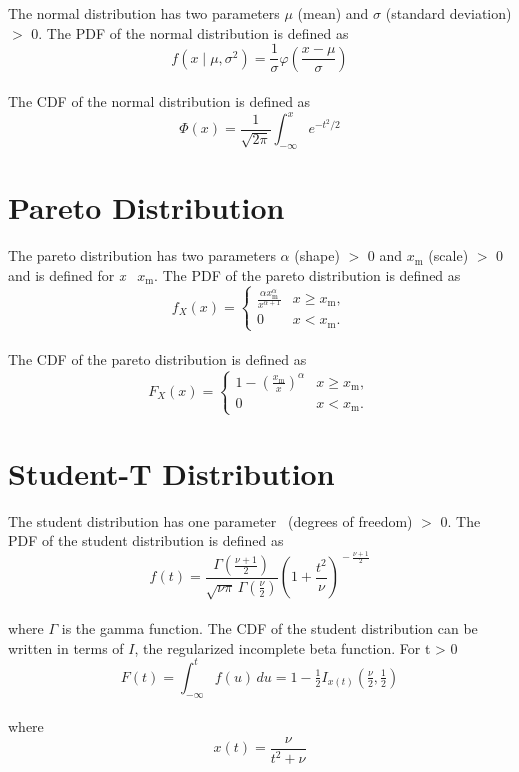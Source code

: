 		The normal distribution has two parameters $\mu$ (mean) and $\sigma$ (standard deviation) $>$ 0. The \ac{PDF} of the normal distribution is defined as
		\\
		$$f(x \mid \mu, \sigma^2) =\frac 1 \sigma \varphi\left(\frac{x-\mu} \sigma \right)$$
		\\
		The \ac{CDF} of the normal distribution is defined as
		\\
		$$\Phi(x) = \frac 1 {\sqrt{2\pi}} \int_{-\infty}^x e^{-t^2/2}$$

	\section{Pareto Distribution}
	
		The pareto distribution has two parameters $\alpha$ (shape) $>$ 0 and $x_\mathrm{m}$ (scale) $>$ 0 and is defined for \textit{x} \geq\ $x_\mathrm{m}$. The \ac{PDF} of the pareto distribution is defined as
		\\
		$$f_X(x)= \begin{cases} \frac{\alpha x_\mathrm{m}^\alpha}{x^{\alpha+1}} & x \ge x_\mathrm{m}, \\ 0 & x < x_\mathrm{m}. \end{cases}$$
		\\
		The \ac{CDF} of the pareto distribution is defined as
		\\
		$$F_X(x) = \begin{cases}1-\left(\frac{x_\mathrm{m}}{x}\right)^\alpha & x \ge x_\mathrm{m}, \\0 & x < x_\mathrm{m}.\end{cases}$$

	\section{Student-T Distribution}
	
		The student distribution has one parameter \nu\ (degrees of freedom) $>$ 0. The \ac{PDF} of the student distribution is defined as
		\\
		$$f(t) = \frac{\Gamma(\frac{\nu+1}{2})} {\sqrt{\nu\pi}\,\Gamma(\frac{\nu}{2})} \left(1+\frac{t^2}{\nu} \right)^{\!-\frac{\nu+1}{2}}$$
		\\
		where $\Gamma$ is the gamma function. The \ac{CDF} of the student distribution can be written in terms of $I$, the regularized incomplete beta function. For t > 0
		\\
		$$F(t) = \int_{-\infty}^t f(u)\,du = 1 - \tfrac{1}{2} I_{x(t)}\left(\tfrac{\nu}{2}, \tfrac{1}{2}\right)$$
		\\
		where $$x(t) = \frac{\nu}{{t^2+\nu}}$$


